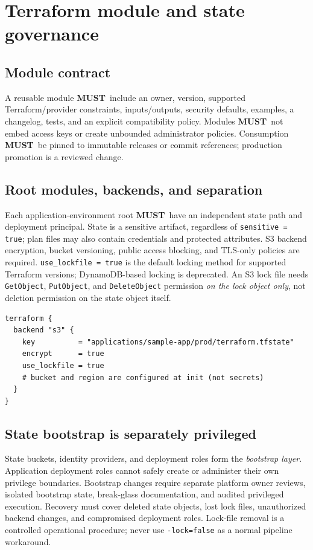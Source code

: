 \documentclass[10pt,letterpaper]{article}
\newcommand{\must}{\textbf{MUST}}
\begin{document}
\section{Terraform module and state governance}
\subsection{Module contract}
A reusable module \must\ include an owner, version, supported Terraform/provider constraints, inputs/outputs, security defaults, examples, a changelog, tests, and an explicit compatibility policy. Modules \must\ not embed access keys or create unbounded administrator policies. Consumption \must\ be pinned to immutable releases or commit references; production promotion is a reviewed change.
\subsection{Root modules, backends, and separation}
Each application-environment root \must\ have an independent state path and deployment principal. State is a sensitive artifact, regardless of \texttt{sensitive = true}; plan files may also contain credentials and protected attributes. S3 backend encryption, bucket versioning, public access blocking, and TLS-only policies are required. \texttt{use\_lockfile = true} is the default locking method for supported Terraform versions; DynamoDB-based locking is deprecated. An S3 lock file needs \texttt{GetObject}, \texttt{PutObject}, and \texttt{DeleteObject} permission \emph{on the lock object only}, not deletion permission on the state object itself.
\begin{verbatim}
terraform {
  backend "s3" {
    key          = "applications/sample-app/prod/terraform.tfstate"
    encrypt      = true
    use_lockfile = true
    # bucket and region are configured at init (not secrets)
  }
}
\end{verbatim}
\subsection{State bootstrap is separately privileged}
State buckets, identity providers, and deployment roles form the \emph{bootstrap layer}. Application deployment roles cannot safely create or administer their own privilege boundaries. Bootstrap changes require separate platform owner reviews, isolated bootstrap state, break-glass documentation, and audited privileged execution. Recovery must cover deleted state objects, lost lock files, unauthorized backend changes, and compromised deployment roles. Lock-file removal is a controlled operational procedure; never use \texttt{-lock=false} as a normal pipeline workaround.
\end{document}
